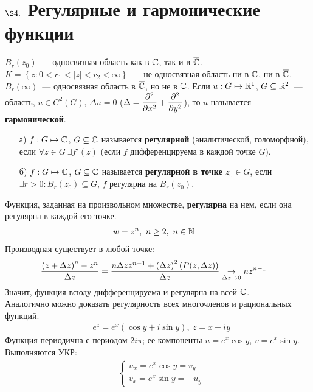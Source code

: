 \section{$\S 4.$ Регулярные и гармонические функции}
\example
$B_r(z_0)$~--- односвязная область как в $\mathbb{C}$, так и в $\overline{\mathbb{C}}$.
\example
$K = \left\{ z: 0 < r_1 < \left| z \right| < r_2 < \infty \right\}$~--- не
односвязная область ни в $\mathbb{C}$, ни в $\overline{\mathbb{C}}$.
\example
$B_r(\infty)$~--- односвязная область в $\overline{\mathbb{C}}$, но не в $\mathbb{C}$.
\Def
Если $u:G \mapsto \mathbb{R}^1$, $G \subseteq \mathbb{R}^2$~--- область, $u \in C^2(G)$,
$\Delta u = 0$ ($\Delta = \displaystyle \frac{\partial^2}{\partial x^2} + \displaystyle
\frac{\partial^2}{\partial y^2}$), то $u$ называется \textbf{гармонической}.
\Def
\begin{itemize}
    \item[а)]$f: G \mapsto \mathbb{C}$, $G \subseteq \mathbb{C}$ называется
    \textbf{регулярной} (аналитической, голоморфной), если $\forall z \in G
    \ \exists f'(z)$ (если $f$ дифференцируема в каждой точке $G$).
    \item[б)]$f: G \mapsto \mathbb{C}$, $G \subseteq \mathbb{C}$ называется
    \textbf{регулярной в точке $z_0 \in G$}, если $\exists r > 0: B_r(z_0)
    \subseteq G$, $f$ регулярна на $B_r(z_0)$.
\end{itemize}
\Def
Функция, заданная на произвольном множестве, \textbf{регулярна} на нем, если она
регулярна в каждой его точке.
\Example
\begin{align*}
  & w = z^n, \ n \geq 2, \ n \in \mathbb{N}
\end{align*}
Производная существует в любой точке:
\begin{align*}
  & \frac{\left( z+\Delta z \right)^n - z^n}{\Delta z} = \frac{n\Delta z z^{n-1} + \left( \Delta z \right)^2\left( P(z, \Delta z) \right)}{\Delta z} \underset{\Delta z \to 0}{\to} nz^{n-1}
\end{align*}
Значит, функция всюду дифференцируема и регулярна на всей $\mathbb{C}$.
\\
Аналогично можно доказать регулярность всех многочленов и рациональных функций.
\Def
\begin{align*}
  & e^z = e^x\left( \cos y + i \sin y \right), \ z = x+iy
\end{align*}
Функция периодична с периодом $2 i \pi$; ее компоненты $u = e^x \cos y$, $v =
e^x \sin y$.
Выполняются УКР:
\begin{align*}
  & \left\{ \begin{matrix}
          u_x = e^x \cos y = v_y \\
          v_x = e^x \sin y = -u_y
      \end{matrix} \right.
\end{align*}
